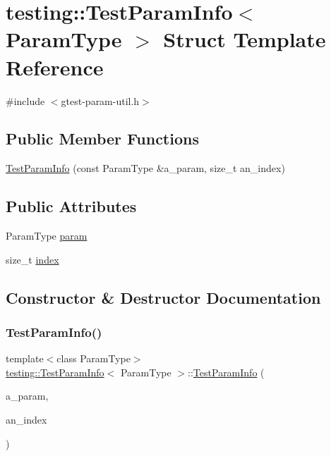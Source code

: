 \hypertarget{structtesting_1_1TestParamInfo}{}\section{testing\+::Test\+Param\+Info$<$ Param\+Type $>$ Struct Template Reference}
\label{structtesting_1_1TestParamInfo}


{\ttfamily \#include $<$gtest-\/param-\/util.\+h$>$}

\subsection*{Public Member Functions}
\begin{DoxyCompactItemize}
\item 
\mbox{\hyperlink{structtesting_1_1TestParamInfo_aa54199319bcad5a33c8538ecaecb6de5}{Test\+Param\+Info}} (const Param\+Type \&a\+\_\+param, size\+\_\+t an\+\_\+index)
\end{DoxyCompactItemize}
\subsection*{Public Attributes}
\begin{DoxyCompactItemize}
\item 
Param\+Type \mbox{\hyperlink{structtesting_1_1TestParamInfo_a146d921039f9da8b1336f7cc6e8436c2}{param}}
\item 
size\+\_\+t \mbox{\hyperlink{structtesting_1_1TestParamInfo_ad4d7bc02cbcc571eb3c1d2ec3ba5bb53}{index}}
\end{DoxyCompactItemize}


\subsection{Constructor \& Destructor Documentation}
\mbox{\label{structtesting_1_1TestParamInfo_aa54199319bcad5a33c8538ecaecb6de5}} 
\subsubsection{\texorpdfstring{TestParamInfo()}{TestParamInfo()}}
{\footnotesize\ttfamily template$<$class Param\+Type$>$ \\
\mbox{\hyperlink{structtesting_1_1TestParamInfo}{testing\+::\+Test\+Param\+Info}}$<$ Param\+Type $>$\+::\mbox{\hyperlink{structtesting_1_1TestParamInfo}{Test\+Param\+Info}} (\begin{DoxyParamCaption}\item[{const Param\+Type \&}]{a\+\_\+param,  }\item[{size\+\_\+t}]{an\+\_\+index }\end{DoxyParamCaption})\hspace{0.3cm}{\ttfamily [inline]}}



